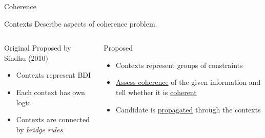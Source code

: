 \begin{frame}{Coherence}
  \begin{block}{Contexts}
    Describe aspects of coherence problem.
    \begin{columns}[t]
      \begin{column}{.5\textwidth}
        \begin{block}{Original}
          Proposed by Sindhu (2010) \\\medskip
          \begin{itemize}
            \item Contexts represent BDI
            \item Each context has own logic
            \item Contexts are connected by
                  \emph{bridge rules}
          \end{itemize}
        \end{block}
      \end{column}
      \begin{column}{.5\textwidth}
        \begin{block}{Proposed}
          \begin{itemize}
            \item Contexts represent groups of constraints
            \item \underline{Assess coherence}
                  of the given information and tell whether
                  it is \underline{coherent}
            \item Candidate is \alert{\underline{propagated}} through
                  the contexts
          \end{itemize}
        \end{block}
      \end{column}
    \end{columns}
  \end{block}
\end{frame}





